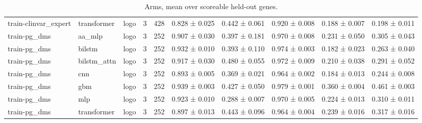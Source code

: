\begin{table}[t]
\begin{tabular}{llllllllll}
train-clinvar\_expert & transformer & logo & 3 & 428 & 0.828 ± 0.025 & 0.442 ± 0.061 & 0.920 ± 0.008 & 0.188 ± 0.007 & 0.198 ± 0.011 \\
train-pg\_dms & aa\_mlp & logo & 3 & 252 & 0.907 ± 0.030 & 0.397 ± 0.181 & 0.970 ± 0.008 & 0.231 ± 0.050 & 0.305 ± 0.043 \\
train-pg\_dms & bilstm & logo & 3 & 252 & 0.932 ± 0.010 & 0.393 ± 0.110 & 0.974 ± 0.003 & 0.182 ± 0.023 & 0.263 ± 0.040 \\
train-pg\_dms & bilstm\_attn & logo & 3 & 252 & 0.917 ± 0.030 & 0.480 ± 0.055 & 0.972 ± 0.009 & 0.210 ± 0.038 & 0.291 ± 0.052 \\
train-pg\_dms & cnn & logo & 3 & 252 & 0.893 ± 0.005 & 0.369 ± 0.021 & 0.964 ± 0.002 & 0.184 ± 0.013 & 0.244 ± 0.008 \\
train-pg\_dms & gbm & logo & 3 & 252 & 0.939 ± 0.003 & 0.427 ± 0.050 & 0.979 ± 0.001 & 0.360 ± 0.004 & 0.461 ± 0.003 \\
train-pg\_dms & mlp & logo & 3 & 252 & 0.923 ± 0.010 & 0.288 ± 0.007 & 0.970 ± 0.005 & 0.224 ± 0.013 & 0.310 ± 0.011 \\
train-pg\_dms & transformer & logo & 3 & 252 & 0.897 ± 0.013 & 0.443 ± 0.096 & 0.964 ± 0.004 & 0.239 ± 0.016 & 0.317 ± 0.016 \\
\bottomrule
\end{tabular}
\caption{Arms, mean over scoreable held-out genes.}
\label{tab:arms}
\end{table}

